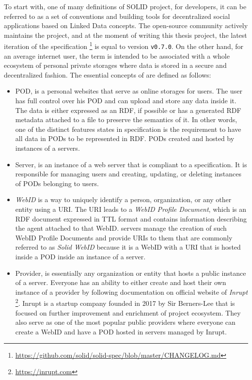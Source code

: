 To start with, one of many definitions of SOLID project, for developers, it can be referred to as a set of conventions and building tools for decentralized social applications based on Linked Data concepts. The open-source community actively maintains the project, and at the moment of writing this thesis project, the latest iteration of the specification \footnote{\url{https://github.com/solid/solid-spec/blob/master/CHANGELOG.md}} is equal to version \texttt{v0.7.0}. On the other hand, for an average internet user, the term \solid{} is intended to be associated with a whole ecosystem of personal private storages where data is stored in a secure and decentralized fashion. The essential concepts of \solid{} are defined as follows:
\begin{itemize}
    \item \solid{} \gls{POD}, is a personal websites that serve as online storages for users. The user has full control over his POD and can upload and store any data inside it. The data is either expressed as an RDF, if possible or has a generated RDF metadata attached to a file to preserve the semantics of it. In other words, one of the distinct features states in \solid{} specification is the requirement to have all data in PODs to be represented in RDF. PODs created and hosted by instances of a \solid{} servers.
    \item \solid{} Server, is an instance of a web server that is compliant to a \solid{} specification. It is responsible for managing users and creating, updating, or deleting instances of PODs belonging to users.
    \item \textit{WebID} is a way to uniquely identify a person, organization, or any other entity using a URI. The URI leads to a \textit{WebID Profile Document}, which is an RDF document expressed in TTL format and contains information describing the agent attached to that WebID. \solid{} servers manage the creation of such WebID Profile Documents and provide URIs to them that are commonly referred to as \textit{Solid WebID} because it is a WebID with a URI that is hosted inside a POD inside an instance of a \solid{} server.
    \item \solid{} Provider, is essentially any organization or entity that hosts a public instance of a \solid{} server. Everyone has an ability to either create and host their own instance of a \solid{} provider by following documentation on official website of \textit{Inrupt} \footnote{\url{https://inrupt.com}}. Inrupt is a startup company founded in 2017 by Sir Berners-Lee that is focused on further improvement and enrichment of \solid{} project ecosystem. They also serve as one of the most popular public \solid{} providers where everyone can create a WebID and have a POD hosted in \solid{} servers managed by Inrupt. 

\end{itemize}
